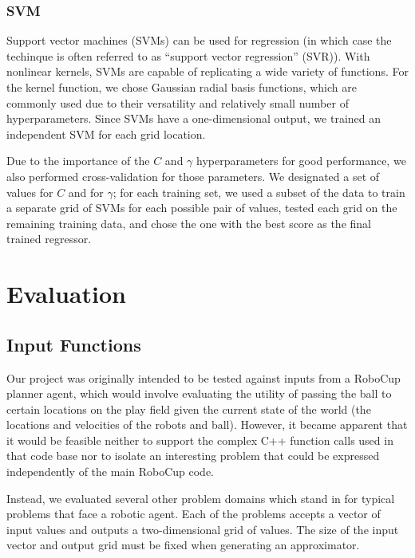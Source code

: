 \documentclass{article}
\begin{document}
\subsubsection{SVM}

Support vector machines (SVMs) can be used for regression (in which case the techinque is often referred to as ``support vector regression'' (SVR)). With nonlinear kernels, SVMs are capable of replicating a wide variety of functions. For the kernel function, we chose Gaussian radial basis functions, which are commonly used due to their versatility and relatively small number of hyperparameters. Since SVMs have a one-dimensional output, we trained an independent SVM for each grid location.

Due to the importance of the $C$ and $\gamma$ hyperparameters for good performance, we also performed cross-validation for those parameters. We designated a set of values for $C$ and for $\gamma$; for each training set, we used a subset of the data to train a separate grid of SVMs for each possible pair of values, tested each grid on the remaining training data, and chose the one with the best score as the final trained regressor.

\section{Evaluation}

\subsection{Input Functions}

Our project was originally intended to be tested against inputs from a RoboCup planner agent, which would involve evaluating the utility of passing the ball to certain locations on the play field given the current state of the world (the locations and velocities of the robots and ball). However, it became apparent that it would be feasible neither to support the complex C++ function calls used in that code base nor to isolate an interesting problem that could be expressed independently of the main RoboCup code.

Instead, we evaluated several other problem domains which stand in for typical problems that face a robotic agent. Each of the problems accepts a vector of input values and outputs a two-dimensional grid of values. The size of the input vector and output grid must be fixed when generating an approximator.
\end{document}
